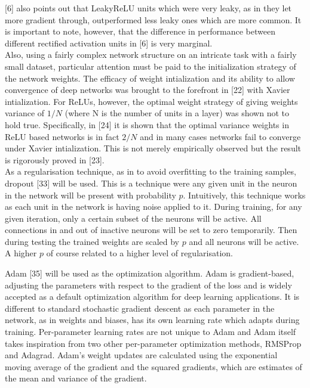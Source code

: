 \documentclass{article}
\begin{document}
[6] also points out that LeakyReLU units which were very leaky, as in they let more gradient through, outperformed less leaky ones which are more common. It is important to note, however, that the difference in performance between different rectified activation units in [6] is very marginal.\\

Also, using a fairly complex network structure on an intricate task with a fairly small dataset, particular attention must be paid to the initialization strategy of the network weights. The efficacy of weight intialization and its ability to allow convergence of deep networks was brought to the forefront in [22] with Xavier intialization. For ReLUs, however, the optimal weight strategy of giving weights variance of $1/N$ (where N is the number of units in a layer) was shown not to hold true. Specifically, in [24] it is shown that the optimal variance weights in ReLU based networks is in fact $2/N$ and in many cases networks fail to converge under Xavier intialization. This is not merely empirically observed but the result is rigorously proved in [23].\\

As a regularisation technique, as in to avoid overfitting to the training samples, dropout [33] will be used. This is a technique were any given unit in the neuron in the network will be present with probability $p$. Intuitively, this technique works as each unit in the network is having noise applied to it. During training, for any given iteration, only a certain subset of the neurons will be active. All connections in and out of inactive neurons will be set to zero temporarily. Then during testing the trained weights are scaled by $p$ and all neurons will be active. A higher $p$ of course related to a higher level of regularisation.

Adam [35] will be used as the optimization algorithm. Adam is gradient-based, adjusting the parameters with respect to the gradient of the loss and is widely accepted as a default optimization algorithm for deep learning applications. It is different to standard stochastic gradient descent as each parameter in the network, as in weights and biases, has its own learning rate which adapts during training. Per-parameter learning rates are not unique to Adam and Adam itself takes inspiration from two other per-parameter optimization methods, RMSProp and Adagrad. Adam's weight updates are calculated using the exponential moving average of the gradient and the squared gradients, which are estimates of the mean and variance of the gradient. \\
\end{document}
